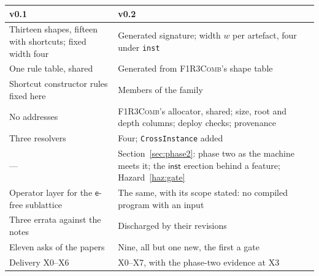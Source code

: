 \documentclass[11pt,a4paper]{article}
\newcommand{\code}[1]{\texttt{#1}}
\newcommand{\Comb}{\textsc{F1R3Comb}}
\newcommand{\ev}{\mathsf{e}}
\theoremstyle{definition}
\theoremstyle{plain}
\newcommand{\inst}{\mathsf{inst}}
\begin{document}
\begin{center}
\begin{tabularx}{\linewidth}{@{}l>{\raggedright\arraybackslash}X@{}}
\toprule
v0.1 & v0.2\\
\midrule
Thirteen shapes, fifteen with shortcuts; fixed width four & Generated
signature; width $w$ per artefact, four under \code{inst}\\
One rule table, shared & Generated from \Comb's shape table\\
Shortcut constructor rules fixed here & Members of the family\\
No addresses & \Comb's allocator, shared; size, root and depth columns;
deploy checks; provenance\\
Three resolvers & Four; \code{CrossInstance} added\\
--- & Section~\ref{sec:phase2}: phase two as the machine meets it; the
$\inst$ erection behind a feature; Hazard~\ref{haz:gate}\\
Operator layer for the $\ev$-free sublattice & The same, with its scope
stated: no compiled program with an input\\
Three errata against the notes & Discharged by their revisions\\
Eleven asks of the papers & Nine, all but one new, the first a gate\\
Delivery X0--X6 & X0--X7, with the phase-two evidence at X3\\
\bottomrule
\end{tabularx}
\end{center}
\end{document}
